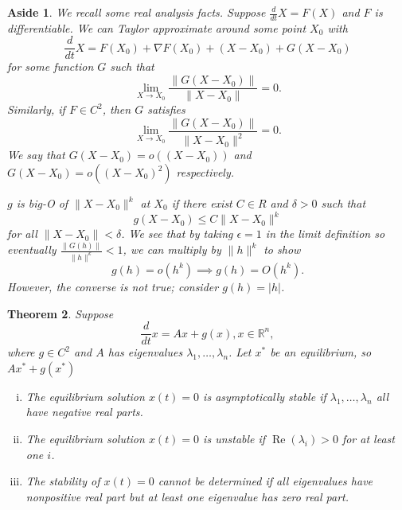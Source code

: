 \documentclass{tufte-handout}
\newcommand*\R{\mathbb{R}}
\newtheorem{thm}{Theorem}[subsection]
\newtheorem{aside}[thm]{Aside}
\theoremstyle{definition}
\begin{document}
\begin{aside}
	We recall some real analysis facts. Suppose $\frac{d}{dt}X = F(X)$ and $F$ is differentiable. We can Taylor approximate around some point $X_0$ with \[
		\frac{d}{dt}X = F(X_0) + \nabla F(X_0) + (X- X_0) + G(X-X_0)
	\] for some function $G$ such that \[
		\lim\limits_{X \to X_0} \frac{\left\| G(X - X_0) \right\|}{\left\| X-X_0 \right\|} = 0
	.\] Similarly, if $F \in C^2$, then $G$ satisfies \[
		\lim\limits_{X  \to X_0} \frac{\left\| G(X-X_0) \right\|}{\|X-X_0\|^2} = 0
	.\] We say that $G(X-X_0) = o\left( \left( X-X_0 \right) \right)$ and $G(X-X_0) = o\left( \left( X-X_0 \right)^2 \right)$ respectively. 

	$g$ is big-O of $\|X-X_0\|^{k}$ at $X_0$ if there exist $C \in R$ and $\delta > 0$ such that \[
		g(X-X_0) \le C \|X-X_0\|^{k}
	\] for all $\|X-X_0\| < \delta$. We see that by taking $\epsilon = 1$ in the limit definition so eventually $\frac{\|G(h)\|}{\|h\|^{k}} < 1$, we can multiply by $\|h\|^{k}$ to show \[
		g(h) = o(h^{k}) \implies g(h) = O(h^{k})
	.\] However, the converse is not true; consider $g(h) = \left| h \right|$.
\end{aside}

\begin{thm}
	Suppose \[
		\frac{d}{dt}x = Ax + g(x), x \in \R^n
	,\] where $g \in C^2$ and $A$ has eigenvalues $\lambda_1,\ldots,\lambda_n$. Let $x^*$ be an equilibrium, so $Ax^* + g(x^*)$
	\begin{enumerate}[(i)]
		\item The equilibrium solution $x(t) = 0$ is asymptotically stable if $\lambda_1,\ldots,\lambda_n$ all have negative real parts.
		\item The equilibrium solution $x(t) = 0$ is unstable if $\operatorname{Re}\left(\lambda_i\right) > 0$ for at least one $i$.
		\item The stability of $x(t) = 0$ cannot be determined if all eigenvalues have nonpositive real part but at least one eigenvalue has zero real part.
	\end{enumerate}
\end{thm}
\end{document}
